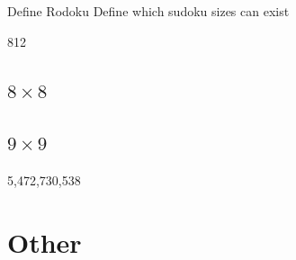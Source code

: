 \documentclass[a4paper,11pt]{report}
\begin{document}
Define Rodoku 
Define which sudoku sizes can exist


812
	\section{$8 \times 8$}
	\section{$9 \times  9$}
5,472,730,538

\chapter{Other}



\end{document}
